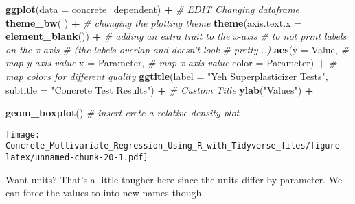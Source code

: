 \documentclass[]{article}
\newenvironment{Shaded}{\begin{snugshade}}{\end{snugshade}}
\newcommand{\CommentTok}[1]{\textcolor[rgb]{0.56,0.35,0.01}{\textit{#1}}}
\newcommand{\DataTypeTok}[1]{\textcolor[rgb]{0.13,0.29,0.53}{#1}}
\newcommand{\KeywordTok}[1]{\textcolor[rgb]{0.13,0.29,0.53}{\textbf{#1}}}
\newcommand{\NormalTok}[1]{#1}
\newcommand{\OperatorTok}[1]{\textcolor[rgb]{0.81,0.36,0.00}{\textbf{#1}}}
\newcommand{\StringTok}[1]{\textcolor[rgb]{0.31,0.60,0.02}{#1}}
\begin{document}
\begin{Shaded}
\begin{Highlighting}[]
\KeywordTok{ggplot}\NormalTok{(}\DataTypeTok{data =}\NormalTok{ concrete_dependent) }\OperatorTok{+}\StringTok{      }\CommentTok{# EDIT Changing dataframe}
\StringTok{  }
\StringTok{  }\KeywordTok{theme_bw}\NormalTok{( ) }\OperatorTok{+}\StringTok{                            }\CommentTok{# changing the plotting theme}
\StringTok{  }
\StringTok{  }\KeywordTok{theme}\NormalTok{(}\DataTypeTok{axis.text.x =} \KeywordTok{element_blank}\NormalTok{()) }\OperatorTok{+}\StringTok{   }\CommentTok{# adding an extra trait to the x-axis}
\StringTok{                                           }\CommentTok{# to not print labels on the x-axis }
\StringTok{                                           }\CommentTok{# (the labels overlap and doesn't look}
\StringTok{                                           }\CommentTok{# pretty...)}
\StringTok{  }
\StringTok{  }\KeywordTok{aes}\NormalTok{(}\DataTypeTok{y      =}\NormalTok{ Value,                     }\CommentTok{# map y-axis value}
      \DataTypeTok{x      =}\NormalTok{ Parameter,                 }\CommentTok{# map x-axis value}
      \DataTypeTok{color  =}\NormalTok{ Parameter) }\OperatorTok{+}\StringTok{               }\CommentTok{# map colors for different quality}
\StringTok{  }
\StringTok{  }\KeywordTok{ggtitle}\NormalTok{(}\DataTypeTok{label    =} \StringTok{"Yeh Superplasticizer Tests"}\NormalTok{,}
          \DataTypeTok{subtitle =} \StringTok{"Concrete Test Results"}\NormalTok{) }\OperatorTok{+}\StringTok{ }\CommentTok{# Custom Title}
\StringTok{  }
\StringTok{  }\KeywordTok{ylab}\NormalTok{(}\StringTok{"Values"}\NormalTok{) }\OperatorTok{+}

\StringTok{  }\KeywordTok{geom_boxplot}\NormalTok{()                          }\CommentTok{# insert crete a relative density plot }
\end{Highlighting}
\end{Shaded}

\texttt{[image: Concrete\_Multivariate\_Regression\_Using\_R\_with\_Tidyverse\_files/figure-latex/unnamed-chunk-20-1.pdf]}

Want units? That's a little tougher here since the units differ by
parameter. We can force the values to into new names though.
\end{document}
